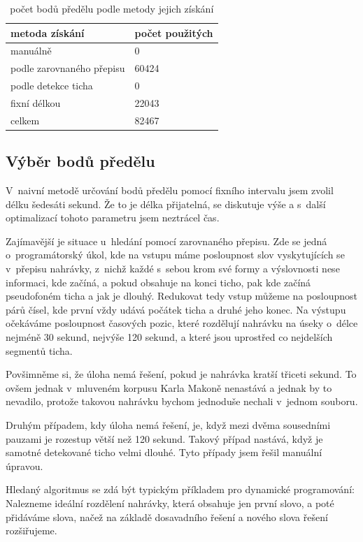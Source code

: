 \begin{table}[htpb]
\begin{center}
\begin{tabular}{|l|l|}
\hline
metoda získání & počet použitých \\
\hline
manuálně & 0 \\
podle zarovnaného přepisu & 60424 \\
podle detekce ticha & 0 \\
fixní délkou & 22043 \\
celkem & 82467 \\
\hline
\end{tabular}
\caption{počet bodů předělu podle metody jejich získání}\label{tab:splitpoints}
\end{center}
\end{table}

\subsection{Výběr bodů předělu}

V~naivní metodě určování bodů předělu pomocí fixního intervalu jsem zvolil délku
šedesáti sekund. Že to je délka přijatelná, se diskutuje výše a s~další
optimalizací tohoto parametru jsem neztrácel čas.

Zajímavější je situace u~hledání pomocí zarovnaného přepisu. Zde se jedná
o~programátorský úkol, kde na vstupu máme posloupnost slov vyskytujících se
v~přepisu nahrávky, z~nichž každé s~sebou krom své formy a výslovnosti nese
informaci, kde začíná, a pokud obsahuje na konci ticho, pak kde začíná
pseudofoném ticha a jak je dlouhý.  Redukovat tedy vstup můžeme na posloupnost
párů čísel, kde první vždy udává počátek ticha a druhé jeho konec. Na výstupu
očekáváme posloupnost časových pozic, které rozdělují nahrávku na úseky o~délce
nejméně 30 sekund, nejvýše 120 sekund, a které jsou uprostřed co nejdelších
segmentů ticha.

Povšimněme si, že úloha nemá řešení, pokud je nahrávka kratší třiceti sekund. To
ovšem jednak v~mluveném korpusu Karla Makoně nenastává a jednak by to nevadilo,
protože takovou nahrávku bychom jednoduše nechali v~jednom souboru.

Druhým případem, kdy úloha nemá řešení, je, když mezi dvěma sousedními pauzami
je rozestup větší než 120 sekund. Takový případ nastává, když je samotné
detekované ticho velmi dlouhé. Tyto případy jsem řešil manuální úpravou.

Hledaný algoritmus se zdá být typickým příkladem pro dynamické programování:
Nalezneme ideální rozdělení nahrávky, která obsahuje jen první slovo, a poté
přidáváme slova, načež na základě dosavadního řešení a nového slova řešení
rozšiřujeme.

